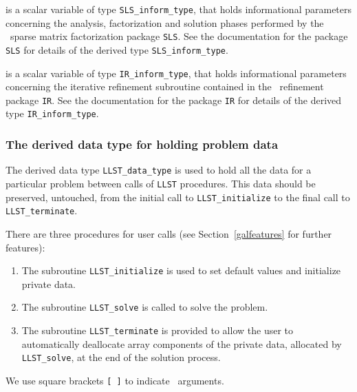 \documentclass{galahad}
\newcommand{\packagename}{LLST}
\begin{document}
\begin{description}
 is a scalar variable of type {\tt SLS\_inform\_type}, 
that holds informational parameters concerning the analysis, factorization
and solution phases performed by 
the \galahad\ sparse matrix factorization package {\tt SLS}. 
See the documentation for the package {\tt SLS} for details of the
derived type {\tt SLS\_inform\_type}.

 is a scalar variable of type {\tt IR\_inform\_type}, 
that holds informational parameters concerning the iterative refinement 
subroutine contained in the \galahad\ refinement package {\tt IR}. 
See the documentation for the package {\tt IR} for details of the
derived type {\tt IR\_inform\_type}.


\end{description}


\subsubsection{The derived data type for holding problem data}\label{typedata}
The derived data type 
{\tt \packagename\_data\_type} 
is used to hold all the data for a particular problem between calls of 
{\tt \packagename} procedures. 
This data should be preserved, untouched, from the initial call to 
{\tt \packagename\_initialize}
to the final call to
{\tt \packagename\_terminate}.


\galarguments
There are three procedures for user calls
(see Section~\ref{galfeatures} for further features): 

\begin{enumerate}
\item The subroutine 
      {\tt \packagename\_initialize} 
      is used to set default values and initialize private data.
\item The subroutine 
      {\tt \packagename\_solve} 
      is called to solve the problem. 
\item The subroutine 
      {\tt \packagename\_terminate} 
      is provided to allow the user to automatically deallocate array 
       components of the private data, allocated by 
       {\tt \packagename\_solve}, 
       at the end of the solution process. 
\end{enumerate}
We use square brackets {\tt [ ]} to indicate \optional\ arguments.

\end{document}

